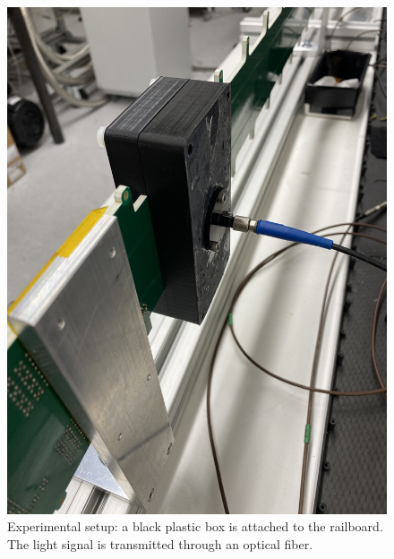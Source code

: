 \documentclass[../BTOF_summary.tex]{subfiles}
\begin{document}
\begin{figure}[h!]
   \centering
    \includegraphics[scale=0.2]{Pictures/Box_SciTile.pdf}
    \caption{Experimental setup: a black plastic box is attached to the railboard. The light signal is transmitted through an optical fiber.}
    \label{fig:Box_SciTile}
\end{figure}
\end{document}
